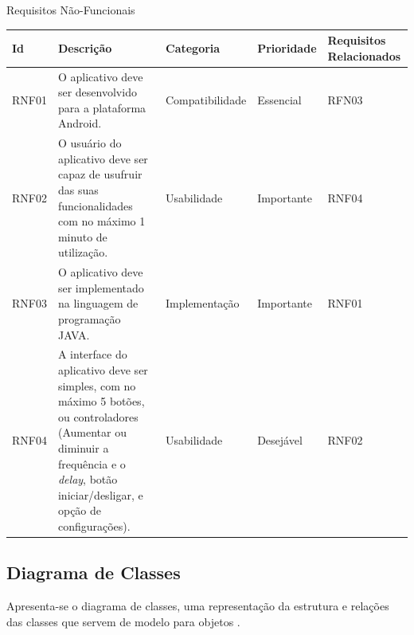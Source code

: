 \begin{quadro}[H]
	\caption{Requisitos N\~ao-Funcionais}\label{quad:reqnaofuncionais}
	\centering
	\begin{tabular}{|p{1.0cm}|p{5.0cm}|p{2.5cm}|p{2.0cm}|p{2.5cm}|}
		\hline
		\textbf{Id} & \textbf{Descri\c{c}\~ao}& \textbf{Categoria} & \textbf{Prioridade} & \textbf{Requisitos Relacionados}\\
		\hline
		RNF01 & O aplicativo deve ser desenvolvido para a plataforma Android. & Compatibilidade & Essencial & RFN03\\
		\hline
		RNF02 & O usu\'ario do aplicativo deve ser capaz de usufruir das suas funcionalidades com no m\'aximo 1 minuto de utiliza\c{c}\~ao. & Usabilidade & Importante & RNF04 \\
		\hline
		RNF03 & O aplicativo deve ser implementado na linguagem de programa\c{c}\~ao JAVA. & Implementa\c{c}\~ao  & Importante & RNF01\\
		\hline
		RNF04 & A interface do aplicativo deve ser simples, com no m\'aximo 5 bot\~oes, ou controladores (Aumentar ou diminuir a frequ\^encia e o \textit{delay}, bot\~ao iniciar/desligar, e op\c{c}\~ao de configura\c{c}\~oes). & Usabilidade & Desej\'avel & RNF02\\
		\hline
	\end{tabular}
\end{quadro}


\subsection{Diagrama de Classes}

Apresenta-se o diagrama de classes, uma representa\c{c}\~ao da estrutura e rela\c{c}\~oes das classes que servem de modelo para objetos \cite{Tybel2017}.

